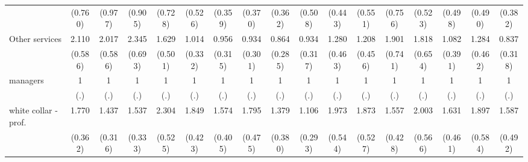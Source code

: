 {\begin{tabular}{l*{16}{c}}
                    &     (0.760)         &     (0.977)         &     (0.905)         &     (0.728)         &     (0.526)         &     (0.359)         &     (0.370)         &     (0.362)         &     (0.508)         &     (0.443)         &     (0.551)         &     (0.756)         &     (0.523)         &     (0.498)         &     (0.490)         &     (0.382)         \\
[1em]
Other services      &       2.110\sym{**} &       2.017\sym{*}  &       2.345\sym{**} &       1.629         &       1.014         &       0.956         &       0.934         &       0.864         &       0.934         &       1.280         &       1.208         &       1.901         &       1.818         &       1.082         &       1.284         &       0.837         \\
                    &     (0.586)         &     (0.586)         &     (0.693)         &     (0.501)         &     (0.332)         &     (0.315)         &     (0.301)         &     (0.285)         &     (0.317)         &     (0.463)         &     (0.456)         &     (0.741)         &     (0.654)         &     (0.391)         &     (0.462)         &     (0.318)         \\
[1em]
managers            &           1         &           1         &           1         &           1         &           1         &           1         &           1         &           1         &           1         &           1         &           1         &           1         &           1         &           1         &           1         &           1         \\
                    &         (.)         &         (.)         &         (.)         &         (.)         &         (.)         &         (.)         &         (.)         &         (.)         &         (.)         &         (.)         &         (.)         &         (.)         &         (.)         &         (.)         &         (.)         &         (.)         \\
[1em]
white collar - prof.&       1.770\sym{**} &       1.437         &       1.537\sym{*}  &       2.304\sym{***}&       1.849\sym{**} &       1.574         &       1.795\sym{*}  &       1.379         &       1.106         &       1.973\sym{*}  &       1.873\sym{*}  &       1.557         &       2.003\sym{*}  &       1.631         &       1.897\sym{*}  &       1.587         \\
                    &     (0.362)         &     (0.316)         &     (0.333)         &     (0.525)         &     (0.423)         &     (0.405)         &     (0.475)         &     (0.380)         &     (0.293)         &     (0.544)         &     (0.527)         &     (0.428)         &     (0.566)         &     (0.461)         &     (0.584)         &     (0.492)         \\

\end{tabular}}
